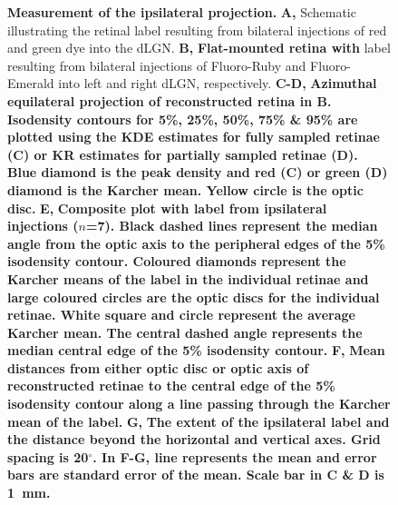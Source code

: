 \documentclass[10pt]{article}
\newcommand\textstylecaptiontitle[1]{\textbf{\textup{#1}}}
\begin{document}
\begin{figure}[!ht]\caption{
\textbf{Measurement of the ipsilateral projection.
}\textbf{A, }Schematic illustrating the retinal label resulting from
bilateral injections of red and green dye into the dLGN.\textbf{ B,
}\textstylecaptiontitle{\textmd{Flat-mounted retina
with}}\textstylecaptiontitle{\textmd{ }}label resulting from
bilateral injections of Fluoro-Ruby and Fluoro-Emerald into left and
right dLGN, respectively.\textbf{ C-D,
}\textstylecaptiontitle{\textmd{Azimuthal equilateral projection of
reconstructed retina in B. Isodensity contours for 5\%, 25\%, 50\%,
75\% \& 95\% are plotted using the KDE estimates for fully sampled
retinae (C) or KR estimates for partially sampled retinae (D). Blue
diamond is the peak density and red (C) or green (D) diamond is the
Karcher mean. Yellow circle is the optic disc.
}}\textstylecaptiontitle{E,}\textstylecaptiontitle{\textmd{ Composite
plot with label from ipsilateral injections
(}}\textstylecaptiontitle{\textmd{$n$}}\textstylecaptiontitle{\textmd{=7).
Black dashed lines represent the median angle from the optic axis to
the peripheral }}\textstylecaptiontitle{\textmd{edges of the 5\%
isodensity contour. Coloured diamonds represent the Karcher means of
the label in the individual retinae and large coloured circles are
the optic discs for the individual retinae. White square and circle
represent the average Karcher mean. The central dashed angle
represents the median central edge of the 5\% isodensity contour.
}}\textstylecaptiontitle{F,}\textstylecaptiontitle{\textmd{ Mean
distances from either optic disc or optic axis of reconstructed
retinae to the central edge of the 5\% isodensity contour along a
line passing through the Karcher mean of the
label.}}\textstylecaptiontitle{ G,}\textstylecaptiontitle{\textmd{
The extent of the ipsilateral label and the distance beyond the
horizontal and vertical axes. Grid spacing is 20$^{\circ}$. In F-G, line
represents the mean and error bars are standard error of the mean.
Scale bar in C \& D is
1}}\textstylecaptiontitle{\textmd{~}}\textstylecaptiontitle{\textmd{mm.}}\textstylecaptiontitle{
}\textbf{ }
}\end{figure}
\end{document}
